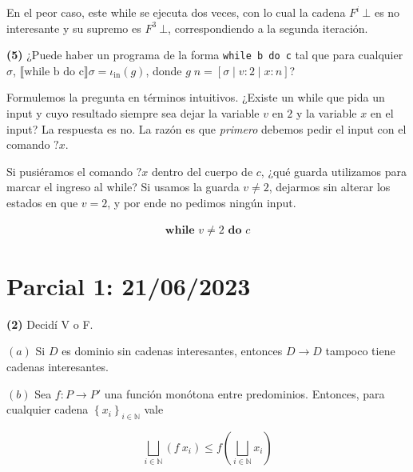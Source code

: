 \documentclass[a4paper, 12pt]{article}
\begin{document}
En el peor caso, este while se ejecuta dos veces, con lo cual la cadena $F^i ~
\bot $ es no interesante y su supremo es $F^3 ~ \bot $, correspondiendo a la
segunda iteración.




\pagebreak
\begin{myframe}
  
\textbf{(5)} ¿Puede haber un programa de la forma \texttt{while b do c} tal que
para cualquier $\sigma$, $\llbracket \text{while b do c} \rrbracket \sigma =
\iota_{\text{in}} (g)$, donde $g \; n = [\sigma \mid v : 2\mid x : n]$?

\end{myframe}

Formulemos la pregunta en términos intuitivos. ¿Existe un while que pida un
input y cuyo resultado siempre sea dejar la variable $v$ en $2$ y la variable
$x$ en el input? La respuesta es no. La razón es que \textit{primero} debemos
pedir el input con el comando $?x$.

Si pusiéramos el comando $?x$ dentro del cuerpo de $c$, ¿qué guarda utilizamos
para marcar el ingreso al while? Si usamos la guarda $v \neq 2$, dejarmos sin
alterar los estados en que $v = 2$, y por ende no pedimos ningún input.

\begin{align*}
  \textbf{while } v \neq 2 \textbf{ do } c
\end{align*}

\pagebreak 

\section{Parcial 1: 21/06/2023}

\begin{myframe}
  \textbf{(2)} Decidí V o F. 

  $(a)$ Si $D$ es dominio sin cadenas interesantes, entonces $D \to D$ tampoco tiene
  cadenas interesantes.

  $(b)$ Sea $f : P \to P'$ una función monótona entre predominios. Entonces,
  para cualquier cadena $\left\{ x_i \right\}_{i \in \mathbb{N}}$ vale 

  \begin{equation*}
    \bigsqcup_{i \in \mathbb{N}} \left( f ~ x_i \right)  \leq f \left(
    \bigsqcup_{i \in \mathbb{N}} x_i \right) 
  \end{equation*}

\end{myframe}
\end{document}
